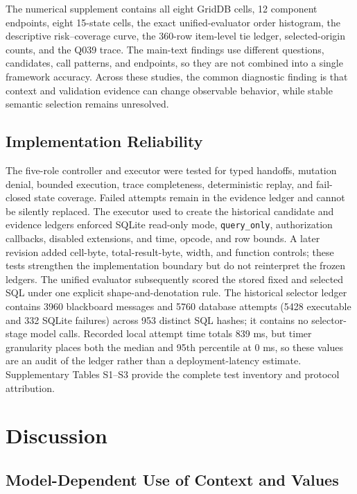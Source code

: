 \documentclass[applsci,article,submit,moreauthors]{Definitions/mdpi}
\begin{document}
The numerical supplement contains all eight GridDB cells, 12 component endpoints, eight 15-state cells, the exact unified-evaluator order histogram, the descriptive risk--coverage curve, the 360-row item-level tie ledger, selected-origin counts, and the Q039 trace. The main-text findings use different questions, candidates, call patterns, and endpoints, so they are not combined into a single framework accuracy. Across these studies, the common diagnostic finding is that context and validation evidence can change observable behavior, while stable semantic selection remains unresolved.

\subsection{Implementation Reliability}

The five-role controller and executor were tested for typed handoffs, mutation denial, bounded execution, trace completeness, deterministic replay, and fail-closed state coverage. Failed attempts remain in the evidence ledger and cannot be silently replaced. The executor used to create the historical candidate and evidence ledgers enforced SQLite read-only mode, \texttt{query\_only}, authorization callbacks, disabled extensions, and time, opcode, and row bounds. A later revision added cell-byte, total-result-byte, width, and function controls; these tests strengthen the implementation boundary but do not reinterpret the frozen ledgers. The unified evaluator subsequently scored the stored fixed and selected SQL under one explicit shape-and-denotation rule. The historical selector ledger contains 3960 blackboard messages and 5760 database attempts (5428 executable and 332 SQLite failures) across 953 distinct SQL hashes; it contains no selector-stage model calls. Recorded local attempt time totals 839 ms, but timer granularity places both the median and 95th percentile at 0 ms, so these values are an audit of the ledger rather than a deployment-latency estimate. Supplementary Tables S1--S3 provide the complete test inventory and protocol attribution.

\section{Discussion}

\subsection{Model-Dependent Use of Context and Values}
\end{document}
